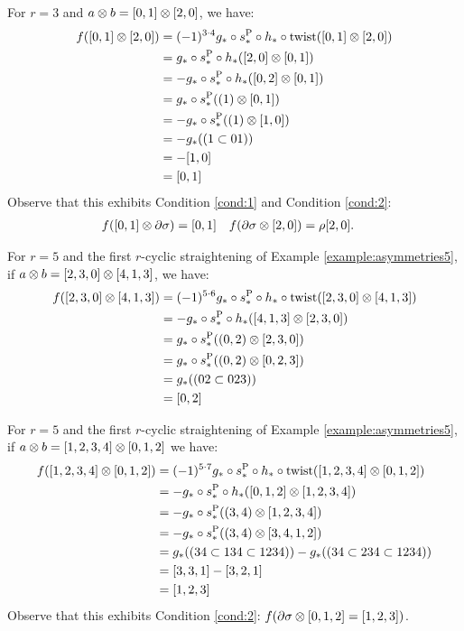 \begin{example}\label{example:f3_2}
	For $r=3$ and $a \otimes b = [0,1] \otimes [2,0]$, we have:
	\begin{align*}
		f([0,1] \otimes [2,0]) &= (-1)^{3\cdot 4}g_*\circ s_*^{\operatorname{P}}\circ h_*\circ \operatorname{twist}([0,1] \otimes [2,0])
		\\
		&= g_*\circ s_*^{\operatorname{P}}\circ h_*([2,0] \otimes [0,1])
		\\
		&= -g_*\circ s_*^{\operatorname{P}}\circ h_*([0,2] \otimes [0,1])
		\\
		&= g_*\circ s_*^{\operatorname{P}}((1) \otimes [0,1])
		\\
		&= -g_*\circ s_*^{\operatorname{P}}((1) \otimes [1,0])
		\\
		&= -g_*((1 \subset 01))
		\\
		&= -[1,0]
		\\
		&= [0,1]
	\end{align*}
	Observe that this exhibits Condition \eqref{cond:1} and Condition \eqref{cond:2}:
	\begin{align*}
		f([0,1] \otimes \partial\sigma) &= [0,1]
		&
		f(\partial\sigma \otimes [2,0]) &= \rho[2,0].
	\end{align*}
\end{example}

\begin{example}\label{example:f5_1}
	For $r=5$ and the first $r$-cyclic straightening of Example \ref{example:asymmetries5}, if $a \otimes b = [2,3,0] \otimes [4,1,3]$, we have:
	\begin{align*}
		f([2,3,0] \otimes [4,1,3]) &= (-1)^{5\cdot 6}g_*\circ s_*^{\operatorname{P}}\circ h_*\circ \operatorname{twist}([2,3,0] \otimes [4,1,3])
		\\
		&= -g_*\circ s_*^{\operatorname{P}}\circ h_*([4,1,3] \otimes [2,3,0])
		\\
		&= g_*\circ s_*^{\operatorname{P}}((0,2) \otimes [2,3,0])
		\\
		&= g_*\circ s_*^{\operatorname{P}}((0,2) \otimes [0,2,3])
		\\
		&= g_*((02 \subset 023))
		\\
		&= [0,2]
	\end{align*}
\end{example}

\begin{example}\label{example:f5_2}
	For $r=5$ and the first $r$-cyclic straightening of Example \ref{example:asymmetries5}, if $a \otimes b = [1,2,3,4] \otimes [0,1,2]$ we have:
	\begin{align*}
		f([1,2,3,4] \otimes [0,1,2])
		&= (-1)^{5\cdot 7}g_*\circ s_*^{\operatorname{P}}\circ h_*\circ \operatorname{twist}([1,2,3,4] \otimes [0,1,2])
		\\
		&= -g_*\circ s_*^{\operatorname{P}}\circ h_*([0,1,2] \otimes [1,2,3,4])
		\\
		&= -g_*\circ s_*^{\operatorname{P}}((3,4) \otimes [1,2,3,4])
		\\
		&= -g_*\circ s_*^{\operatorname{P}}((3,4) \otimes [3,4,1,2])
		\\
		&= g_*((34 \subset 134 \subset 1234)) - g_*((34 \subset 234 \subset 1234))
		\\
		&= [3,3,1] - [3,2,1]
		\\
		&= [1,2,3]
	\end{align*}
	Observe that this exhibits Condition \eqref{cond:2}: $f(\partial\sigma \otimes [0,1,2] = [1,2,3])$.
\end{example}

